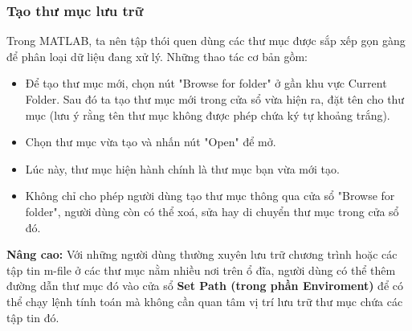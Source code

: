\documentclass[12pt,a4paper]{article}
\begin{document}
\subsubsection{Tạo thư mục lưu trữ}
Trong MATLAB, ta nên tập thói quen dùng các thư mục được sắp xếp gọn gàng để phân loại dữ liệu đang xử lý. Những thao tác cơ bản gồm:
\begin{itemize}
	\item Để tạo thư mục mới, chọn nút "Browse for folder" ở gần khu vực Current Folder. Sau đó ta tạo thư mục mới trong cửa sổ vừa hiện ra, đặt tên cho thư mục (lưu ý rằng tên thư mục không được phép chứa ký tự khoảng trắng).
	\item Chọn thư mục vừa tạo và nhấn nút "Open" để mở.
	\item Lúc này, thư mục hiện hành chính là thư mục bạn vừa mới tạo.
	\item Không chỉ cho phép người dùng tạo thư mục thông qua cửa sổ "Browse for folder", người dùng còn có thể xoá, sửa hay di chuyển thư mục trong cửa sổ đó.
\end{itemize}
\textbf{Nâng cao:} Với những người dùng thường xuyên lưu trữ chương trình hoặc các tập tin m-file ở các thư mục nằm nhiều nơi trên ổ đĩa, người dùng có thể thêm đường dẫn thư mục đó vào cửa sổ \textbf{Set Path (trong phần Enviroment)} để có thể chạy lệnh tính toán mà không cần quan tâm vị trí lưu trữ thư mục chứa các tập tin đó.
\end{document}
